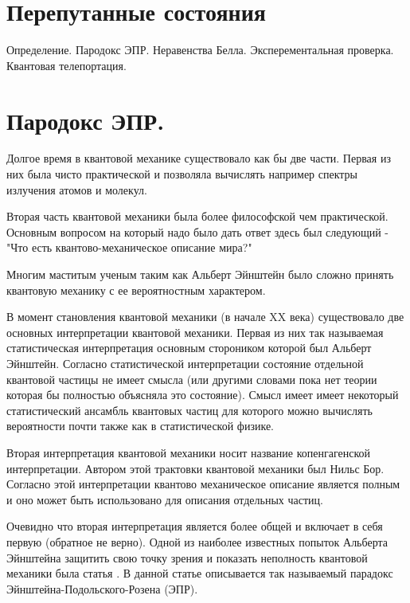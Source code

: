 \section{Перепутанные состояния}
Определение. Пародокс ЭПР. Неравенства Белла. Эксперементальная
проверка. Квантовая телепортация.

\section{Пародокс ЭПР.}

Долгое время в квантовой механике существовало как бы две
части. Первая из них была чисто практической и позволяла вычислять
например спектры излучения атомов и молекул. 

Вторая часть квантовой механики была более философской чем
практической. Основным вопросом на который надо было дать ответ здесь
был следующий - "Что есть квантово-механическое описание мира?" 

Многим маститым ученым таким как Альберт Эйнштейн было сложно принять
квантовую механику с ее вероятностным характером. 

В момент становления квантовой механики (в начале XX века)
существовало две основных интерпретации квантовой механики. Первая из 
них так называемая статистическая интерпретация основным стороником
которой был Альберт Эйнштейн. Согласно статистической интерпретации
состояние отдельной квантовой частицы не имеет смысла (или другими
словами пока нет теории которая бы полностью объясняла это
состояние). Смысл имеет имеет некоторый статистический ансамбль
квантовых частиц для которого можно вычислять вероятности почти также
как в статистической физике. 

Вторая интерпретация квантовой механики носит название копенгагенской
интерпретации. Автором этой трактовки квантовой механики
был Нильс Бор. Согласно этой интерпретации квантово механическое
описание является полным и оно может быть использовано для описания
отдельных частиц.

Очевидно что вторая интерпретация является более общей и включает в
себя первую (обратное не верно). Одной из наиболее известных попыток
Альберта Эйнштейна защитить свою точку зрения и показать неполность
квантовой механики была статья \cite{bEPR}. В данной статье описывается так
называемый парадокс Эйнштейна-Подольского-Розена (ЭПР). 

